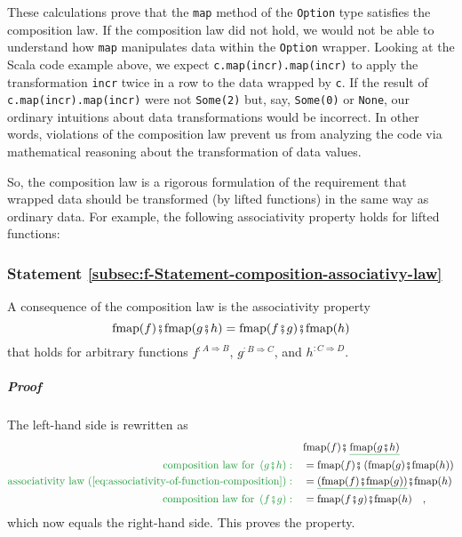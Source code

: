 These calculations prove that the \lstinline!map! method of the \lstinline!Option!
type satisfies the composition law. If the composition law did not
hold, we would not be able to understand how \lstinline!map! manipulates
data within the \lstinline!Option! wrapper. Looking at the Scala
code example above, we expect \lstinline!c.map(incr).map(incr)! to
apply the transformation \lstinline!incr! twice in a row to the data
wrapped by \lstinline!c!. If the result of \lstinline!c.map(incr).map(incr)!
were not \lstinline!Some(2)! but, say, \lstinline!Some(0)! or \lstinline!None!,
our ordinary intuitions about data transformations would be incorrect.
In other words, violations of the composition law prevent us from
analyzing the code via mathematical reasoning about the transformation
of data values.

So, the composition law is a rigorous formulation of the requirement
that wrapped data should be transformed (by lifted functions) in the
same way as ordinary data. For example, the following associativity
property holds for lifted functions:

\subsubsection{Statement \label{subsec:f-Statement-composition-associativy-law}\ref{subsec:f-Statement-composition-associativy-law}}

A consequence of the composition law is the associativity property
\[
\text{fmap}(f)\bef\text{fmap}(g\bef h)=\text{fmap}(f\bef g)\bef\text{fmap}(h)
\]
that holds for arbitrary functions $f^{:A\Rightarrow B}$, $g^{:B\Rightarrow C}$,
and $h^{:C\Rightarrow D}$.

\subparagraph{Proof}

The left-hand side is rewritten as
\begin{align*}
 & \text{fmap}(f)\bef\,\gunderline{\text{fmap}(g\bef h)}\\
{\color{greenunder}\text{composition law for }\left(g\bef h\right):}\quad & =\text{fmap}(f)\bef\left(\text{fmap}(g)\bef\text{fmap}(h)\right)\\
{\color{greenunder}\text{associativity law (\ref{eq:associativity-of-function-composition})}:}\quad & =\gunderline{\left(\text{fmap}(f)\bef\text{fmap}(g)\right)}\bef\text{fmap}(h)\\
{\color{greenunder}\text{composition law for }\left(f\bef g\right):}\quad & =\text{fmap}(f\bef g)\bef\text{fmap}(h)\quad,
\end{align*}
which now equals the right-hand side. This proves the property.


